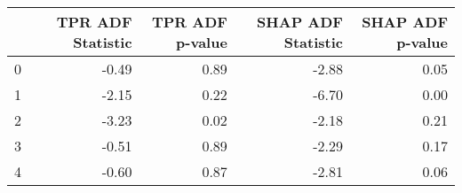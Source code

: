 \begin{tabular}{lrrrr}
\toprule
 & TPR ADF Statistic & TPR ADF p-value & SHAP ADF Statistic & SHAP ADF p-value \\
\midrule
0 & -0.49 & 0.89 & -2.88 & 0.05 \\
1 & -2.15 & 0.22 & -6.70 & 0.00 \\
2 & -3.23 & 0.02 & -2.18 & 0.21 \\
3 & -0.51 & 0.89 & -2.29 & 0.17 \\
4 & -0.60 & 0.87 & -2.81 & 0.06 \\
\bottomrule
\end{tabular}
